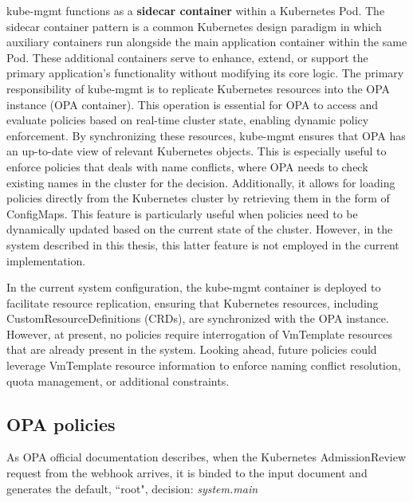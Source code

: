 kube-mgmt functions as a \textbf{sidecar container} within a Kubernetes Pod. The sidecar container pattern is a common Kubernetes design paradigm in which auxiliary containers run alongside the main application container within the same Pod. These additional containers serve to enhance, extend, or support the primary application's functionality without modifying its core logic.  %
The primary responsibility of kube-mgmt is to replicate Kubernetes resources into the OPA instance (OPA container). This operation is essential for OPA to access and evaluate policies based on real-time cluster state, enabling dynamic policy enforcement. By synchronizing these resources, kube-mgmt ensures that OPA has an up-to-date view of relevant Kubernetes objects.
This is especially useful to enforce policies that deals with name conflicts, where OPA needs to check existing names in the cluster for the decision.
Additionally, it allows for loading policies directly from the Kubernetes cluster by retrieving them in the form of ConfigMaps. This feature is particularly useful when policies need to be dynamically updated based on the current state of the cluster. However, in the system described in this thesis, this latter feature is not employed in the current implementation. %


In the current system configuration, the kube-mgmt container is deployed to facilitate resource replication, ensuring that Kubernetes resources, including CustomResourceDefinitions (CRDs), are synchronized with the OPA instance. However, at present, no policies require interrogation of VmTemplate resources that are already present in the system.
Looking ahead, future policies could leverage VmTemplate resource information to enforce naming conflict resolution, quota management, or additional constraints.



\newpage




\subsection{OPA policies}
\label{sec:opa_policies}






As OPA official documentation describes, when the Kubernetes AdmissionReview request from the webhook arrives, it is binded to the input document and generates the default, ``root", decision: \textit{system.main}

